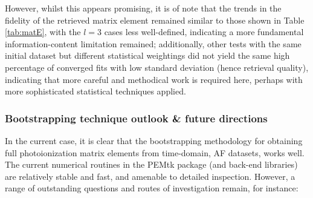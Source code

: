 \documentclass[10pt]{article}
\begin{document}
However, whilst this appears promising, it is of note that the trends in the fidelity of the retrieved matrix element remained similar to those shown in Table \ref{tab:matE}, with the $l=3$ cases less well-defined, indicating a more fundamental information-content limitation remained; additionally, other tests with the same initial dataset but different statistical weightings did not yield the same high percentage of converged fits with low standard deviation (hence retrieval quality), indicating that more careful and methodical work is required here, perhaps with more sophisticated statistical techniques applied.





\subsubsection{Bootstrapping technique outlook \& future directions}

In the current case, it is clear that the bootstrapping methodology for obtaining full photoionization matrix elements from time-domain, AF datasets, works well. The current numerical routines in the PEMtk package (and back-end libraries) are relatively stable and fast, and amenable to detailed inspection. However, a range of outstanding questions and routes of investigation remain, for instance:
\end{document}
